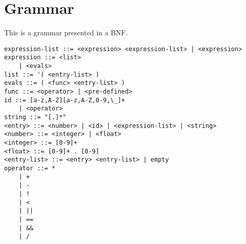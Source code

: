 \section{Grammar}

This is a grammar presented in a BNF. 


\begin{lstlisting}
expression-list ::= <expression> <expression-list> | <expression>
expression ::= <list> 
	| <evals>
list ::= '( <entry-list> )
evals ::= ( <func> <entry-list> ) 
func ::= <operator> | <pre-defined>
id ::= [a-z,A-Z][a-z,A-Z,0-9,\_]+
	| <operator> 
string ::= "[.]*"
<entry> ::= <number> | <id> | <expression-list> | <string>
<number> ::= <integer> | <float> 
<integer> ::= [0-9]+
<float> ::= [0-9]+ . [0-9]
<entry-list> ::= <entry> <entry-list> | empty
operator ::= *
	| +
	| -
	| !
	| < 
	| ||
	| ==
	| &&
	| /
\end{lstlisting}

